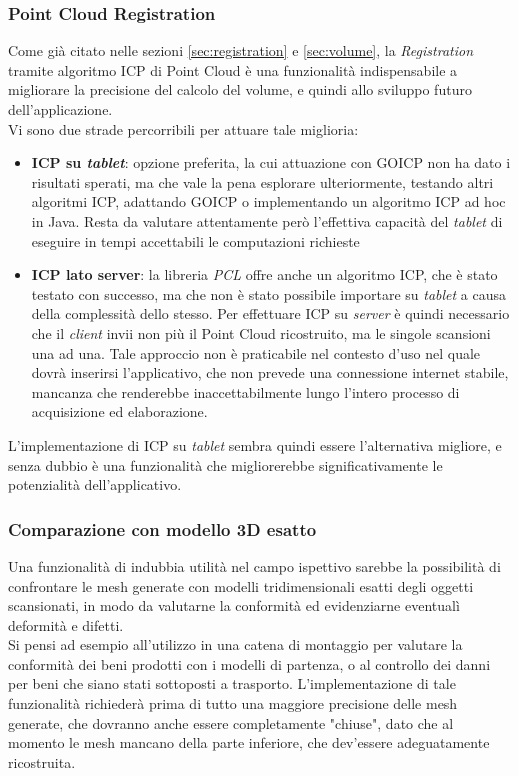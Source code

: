 \subsubsection{Point Cloud Registration}
Come già citato nelle sezioni \ref{sec:registration} e \ref{sec:volume}, la \emph{Registration} tramite algoritmo ICP di Point Cloud è una funzionalità indispensabile a migliorare la precisione del calcolo del volume, e quindi allo sviluppo futuro dell'applicazione. \\
Vi sono due strade percorribili per attuare tale miglioria:
\begin{itemize}
\item \textbf{ICP su \emph{tablet}}: opzione preferita, la cui attuazione con GOICP non ha dato i risultati sperati, ma che vale la pena esplorare ulteriormente, testando altri algoritmi ICP, adattando GOICP o implementando un algoritmo ICP ad hoc in Java. Resta da valutare attentamente però l'effettiva capacità del \emph{tablet} di eseguire in tempi accettabili le computazioni richieste
\item \textbf{ICP lato server}: la libreria \emph{PCL} offre anche un algoritmo ICP, che è stato testato con successo, ma che non è stato possibile importare su \emph{tablet} a causa della complessità dello stesso. Per effettuare ICP su \emph{server} è quindi necessario che il \emph{client} invii non più il Point Cloud ricostruito, ma le singole scansioni una ad una. Tale approccio non è praticabile nel contesto d'uso nel quale dovrà inserirsi l'applicativo, che non prevede una connessione internet stabile, mancanza che renderebbe inaccettabilmente lungo l'intero processo di acquisizione ed elaborazione.
\end{itemize}
\noindent
L'implementazione di ICP su \emph{tablet} sembra quindi essere l'alternativa migliore, e senza dubbio è una funzionalità che migliorerebbe significativamente le potenzialità dell'applicativo.

\subsubsection{Comparazione con modello 3D esatto}
Una funzionalità di indubbia utilità nel campo ispettivo sarebbe la possibilità di confrontare le mesh generate con modelli tridimensionali esatti degli oggetti scansionati, in modo da valutarne la conformità ed evidenziarne eventualì deformità e difetti.\\
 Si pensi ad esempio all'utilizzo in una catena di montaggio per valutare la conformità dei beni prodotti con i modelli di partenza, o al controllo dei danni per beni che siano stati sottoposti a trasporto.
L'implementazione di tale funzionalità richiederà prima di tutto una maggiore precisione delle mesh generate, che dovranno anche essere completamente "chiuse", dato che al momento le mesh mancano della parte inferiore, che dev'essere adeguatamente ricostruita.

